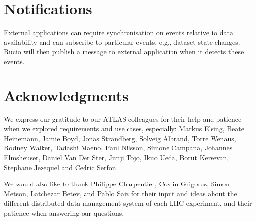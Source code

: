 \documentclass{atlasnote}
\begin{document}
\section{Notifications}
\label{overview_Notifications:notifications}\label{overview_Notifications::doc}
External applications can require synchronisation on events relative
to data availability and can subscribe to particular 
events, e.g., dataset state changes. Rucio will then publish a message
to external application when it detects these events.

\section*{Acknowledgments}
\label{Acknowledgments::doc}\label{Acknowledgments:acknowledgments}
We express our gratitude to our ATLAS colleagues for their help and
patience when we explored requirements and use cases, especially:
Markus Elsing, Beate Heinemann, Jamie Boyd, Jonas Strandberg, Solveig Albrand, Torre Wenaus, Rodney
Walker, Tadashi Maeno, Paul Nilsson, Simone Campana, Johannes
Elmsheuser, Daniel Van Der Ster, Junji Tojo, Ikuo Ueda, Borut
Kersevan, Stephane Jezequel and Cedric Serfon.


We would also like to thank Philippe Charpentier, Costin Grigoras,
Simon Metson, Latchezar Betev, and Pablo Saiz for their input and
ideas about the different distributed data management system of each
LHC experiment, and their patience when answering our questions.

\newpage

\label{rucio:appendices}
\end{document}
